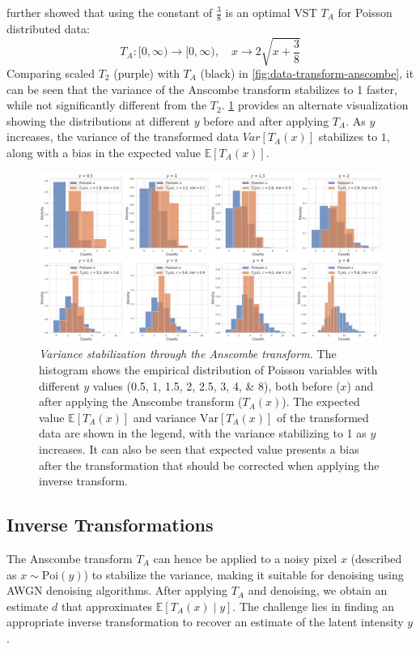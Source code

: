 \citeauthor{anscombeTransformationPoissonBinomial1948} \cite{anscombeTransformationPoissonBinomial1948} further showed that using the  constant of $\frac{3}{8}$ is an optimal \gls{VST} $T_A$ for Poisson distributed data:
\begin{equation}\label{eq:anscombe-transform}
    T_A: [0, \infty) \to [0, \infty), \quad x \to 2 \sqrt{x + \frac{3}{8}}
\end{equation}
Comparing scaled $T_2$ (purple) with $T_A$ (black) in \cref{fig:data-transform-anscombe}, it can be seen that the variance of the Anscombe transform stabilizes to \num{1} faster, while not significantly different from the $T_2$. \cref{fig:hist-anscombe} provides an alternate visualization showing the distributions at different $y$ before and after applying $T_A$. As $y$ increases, the variance of the transformed data $Var[T_A(x)]$ stabilizes to $1$, along with a bias in the expected value $\mathbb{E}[T_A(x)]$.

\begin{figure}
    \centering
    \includegraphics[width=1\linewidth]{images/hist_anscombe.pdf}
    \caption{\textit{Variance stabilization through the Anscombe transform.} The histogram shows the empirical distribution of Poisson  variables with different $y$ values (\numlist{0.5;1;1.5;2;2.5;3;4;8}), both before ($x$) and after applying the Anscombe transform ($T_A(x)$). The expected value $\mathbb{E}[T_A(x)]$ and variance $\text{Var}[T_A(x)]$ of the transformed data are shown in the legend, with the variance stabilizing to \num{1} as $y$ increases. It can also be seen that expected value presents a bias after the transformation that should be corrected when applying the inverse transform.}
    \label{fig:hist-anscombe}
\end{figure}

\subsection{Inverse Transformations}\label{sec:inverse-transformations}
The Anscombe transform $T_A$ can hence be applied to a noisy pixel $x$ (described as $x \sim \text{Poi}(y)$) to stabilize the variance, making it suitable for denoising using \gls{AWGN} denoising algorithms. After applying $T_A$ and denoising, we obtain an estimate $d$ that approximates $\mathbb{E}[T_A(x) \mid y]$. The challenge lies in finding an appropriate inverse transformation to recover an estimate of the latent intensity $y$. 

